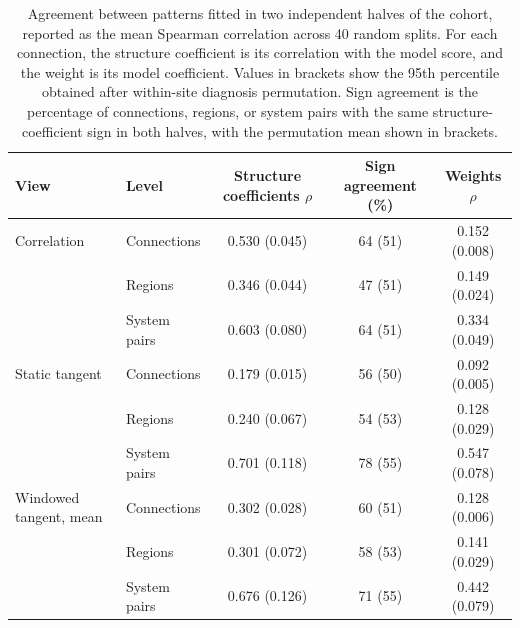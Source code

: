 \begin{table}[t]
\centering

\caption{Agreement between patterns fitted in two independent halves of the cohort, reported as the mean Spearman correlation across 40 random splits. For each connection, the structure coefficient is its correlation with the model score, and the weight is its model coefficient. Values in brackets show the 95th percentile obtained after within-site diagnosis permutation. Sign agreement is the percentage of connections, regions, or system pairs with the same structure-coefficient sign in both halves, with the permutation mean shown in brackets.}

\label{tab:pattern-reproducibility}
\small
\begin{tabular}{@{}llccc@{}}
\toprule
View & Level & Structure coefficients $\rho$ & Sign agreement (\%) & Weights $\rho$ \\
\midrule
Correlation & Connections & 0.530 (0.045) & 64 (51) & 0.152 (0.008) \\
 & Regions & 0.346 (0.044) & 47 (51) & 0.149 (0.024) \\
 & System pairs & 0.603 (0.080) & 64 (51) & 0.334 (0.049) \\
\midrule
Static tangent & Connections & 0.179 (0.015) & 56 (50) & 0.092 (0.005) \\
 & Regions & 0.240 (0.067) & 54 (53) & 0.128 (0.029) \\
 & System pairs & 0.701 (0.118) & 78 (55) & 0.547 (0.078) \\
\midrule
Windowed tangent, mean & Connections & 0.302 (0.028) & 60 (51) & 0.128 (0.006) \\
 & Regions & 0.301 (0.072) & 58 (53) & 0.141 (0.029) \\
 & System pairs & 0.676 (0.126) & 71 (55) & 0.442 (0.079) \\
\bottomrule
\end{tabular}
\end{table}


